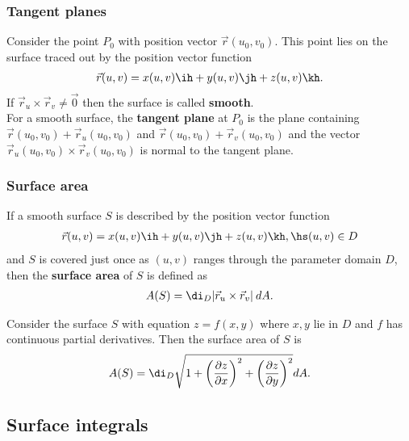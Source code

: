 \documentclass{article}
\begin{document}
\subsubsection{Tangent planes}

\begin{definition}
	Consider the point $P_0$ with position vector $\vec r(u_0, v_0)$. This point lies
	on the surface traced out by the position vector function
	\begin{align*}
		\vec r(u,v) = x(u,v)\ih + y(u,v)\jh + z(u,v)\kh.
	\end{align*}
	If $\vec r_u \times\vec r_v\not=\vec 0$ then the surface is called \textbf{smooth}.\\
	For a smooth surface, the \textbf{tangent plane} at $P_0$ is the plane containing
	$\vec r(u_0,v_0)+\vec r_u(u_0,v_0)$ and $\vec r(u_0,v_0)+\vec r_v(u_0,v_0)$ and the vector
	$\vec r_u(u_0,v_0)\times \vec r_v(u_0,v_0)$ is normal to the tangent plane.

\end{definition}

\subsubsection{Surface area}

\begin{definition}
	If a smooth surface $S$ is described by the position vector function
	\begin{align*}
		\vec r(u,v) = x(u,v)\ih + y(u,v)\jh + z(u,v)\kh,\hs (u,v)\in D
	\end{align*}
	and $S$ is covered just once as $(u,v)$ ranges through the parameter domain $D$,
	then the \textbf{surface area} of $S$ is defined as
	\begin{align*}
		A(S)=\di_D |\vec r_u \times \vec r_v|\:dA.
	\end{align*}
\end{definition}
\begin{theorem}
	Consider the surface $S$ with equation $z=f(x,y)$ where $x,y$ lie in $D$ and $f$
	has continuous partial derivatives. Then the surface area of $S$ is
	\begin{align*}
		A(S) = \di_D \sqrt{1+\left(\frac{\partial z}{\partial x}\right)^2 + \left(\frac{\partial z}{\partial y}\right)^2}dA.
	\end{align*}
\end{theorem}


\subsection{Surface integrals}
\end{document}
